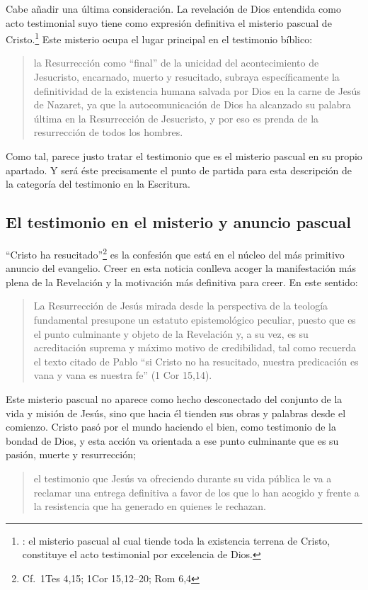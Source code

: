 Cabe añadir una última consideración. La revelación de Dios entendida como acto
testimonial suyo tiene como expresión definitiva el misterio pascual de
Cristo.\footnote{\cite[128]{prades2015testimonio}: el misterio pascual al cual
  tiende toda la existencia terrena de Cristo, constituye el acto testimonial
  por excelencia de Dios.} Este misterio ocupa el lugar principal en el
testimonio bíblico:
\blockquote[{\cite[404]{ninot2009tf}}]{la Resurrección como \enquote{final} de
  la unicidad del acontecimiento de Jesucristo, encarnado, muerto y resucitado,
  subraya específicamente la definitividad de la existencia humana salvada por
  Dios en la carne de Jesús de Nazaret, ya que la autocomunicación de Dios ha
  alcanzado su palabra última en la Resurrección de Jesucristo, y por eso es
  prenda de la resurrección de todos los hombres.}
Como tal, parece justo tratar el testimonio que es el misterio pascual en su
propio apartado. Y será éste precisamente el punto de partida para esta
descripción de la categoría del testimonio en la Escritura.

\subsection{El testimonio en el misterio y anuncio pascual}

\enquote{Cristo ha resucitado}\footnote{Cf.~1Tes 4,15; 1Cor 15,12--20; Rom 6,4}
es la confesión que está en el núcleo del más primitivo anuncio del
evangelio.\autocite[Cf.][403]{ninot2009tf} Creer en esta noticia conlleva acoger
la manifestación más plena de la Revelación y la motivación más definitiva para
creer. En este sentido:
\blockquote[{\cite[405]{ninot2009tf}}]{La Resurrección de Jesús mirada desde la
  perspectiva de la teología fundamental presupone un estatuto epistemológico
  peculiar, puesto que es el punto culminante y objeto de la Revelación y, a su
  vez, es su acreditación suprema y máximo motivo de credibilidad, tal como
  recuerda el texto citado de Pablo \enquote{si Cristo no ha resucitado, nuestra
    predicación es vana y vana es nuestra fe} (1 Cor 15,14).}

Este misterio pascual no aparece como hecho desconectado del conjunto de la vida
y misión de Jesús, sino que hacia él tienden sus obras y palabras desde el
comienzo. Cristo pasó por el mundo haciendo el bien, como testimonio de la
bondad de Dios, y esta acción va orientada a ese punto culminante que es su
pasión, muerte y resurrección;
\blockquote[{\cite[127]{prades2015testimonio}}]{el testimonio que Jesús va
  ofreciendo durante su vida pública le va a reclamar una entrega definitiva a
  favor de los que lo han acogido y frente a la resistencia que ha generado en
  quienes le rechazan.}

